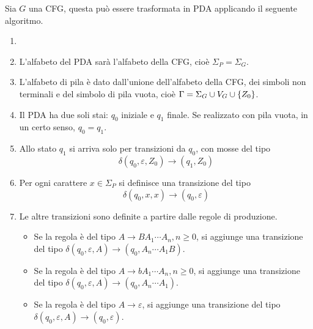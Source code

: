 \documentclass{subfiles}
\begin{document}
Sia \(G\) una CFG, questa può essere trasformata in PDA applicando il seguente algoritmo.
\begin{Algorithm*}
    \begin{enumerate}
        \item []
        \item L'alfabeto del PDA sarà l'alfabeto della CFG, cioè \(\Sigma_{P} = \Sigma_{G}\).
        \item L'alfabeto di pila è dato dall'unione dell'alfabeto della CFG, dei simboli non terminali e del simbolo di pila vuota, cioè \(\Gamma = \Sigma_{G} \cup V_{G} \cup \left\{Z_{0}\right\}\).
        \item Il PDA ha due soli stai: \(q_{0}\) iniziale e \(q_{1}\) finale. Se realizzato con pila vuota, in un certo senso, \(q_{0} = q_{1}\).
        \item Allo stato \(q_{1}\) si arriva solo per transizioni da \(q_{0}\), con mosse del tipo
              \[
                  \delta(q_{0}, \varepsilon, Z_{0}) \to (q_{1}, Z_{0})
              \]
        \item Per ogni carattere \(x \in \Sigma_{P}\) si definisce una transizione del tipo
              \[
                  \delta(q_{0}, x, x) \to (q_{0}, \varepsilon)
              \]
        \item Le altre transizioni sono definite a partire dalle regole di produzione.
              \begin{itemize}
                  \item Se la regola è del tipo \(A \to BA_{1} \cdots A_{n}, n \ge 0\), si aggiunge una transizione del tipo \(\delta(q_{0}, \varepsilon, A) \to (q_{0}, A_{n} \cdots A_{1}B)\).
                  \item Se la regola è del tipo \(A \to bA_{1} \cdots A_{n}, n \ge 0\), si aggiunge una transizione del tipo \(\delta(q_{0}, \varepsilon, A) \to (q_{0}, A_{n} \cdots A_{1})\).
                  \item Se la regola è del tipo \(A \to \varepsilon \), si aggiunge una transizione del tipo \(\delta(q_{0}, \varepsilon, A) \to (q_{0}, \varepsilon)\).
              \end{itemize}
    \end{enumerate}
\end{Algorithm*}
\clearpage
\end{document}

